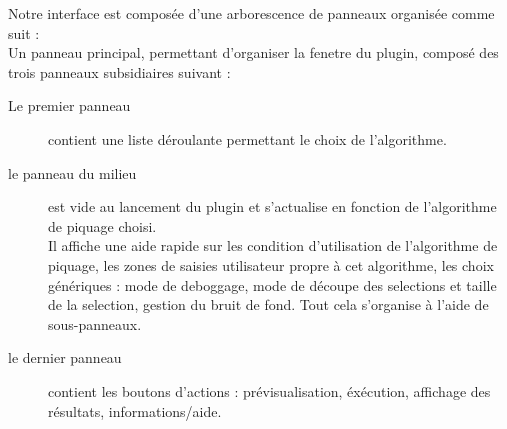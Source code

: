 Notre interface est composée d'une arborescence de panneaux organisée comme suit : \\
Un panneau principal, permettant d'organiser la fenetre du plugin, composé des trois panneaux subsidiaires suivant :
\begin{description}
\item [Le premier panneau] contient une liste déroulante permettant le choix de l'algorithme. 
\item [le panneau du milieu] est vide au lancement du plugin et s'actualise en fonction de l'algorithme de piquage choisi.\\
Il affiche une aide rapide sur les condition d'utilisation de l'algorithme de piquage, les zones de saisies utilisateur propre à cet algorithme, les choix génériques : mode de deboggage, mode de découpe des selections et taille de la selection, gestion du bruit de fond. Tout cela s'organise à l'aide de sous-panneaux.
\item [le dernier panneau] contient les boutons d'actions : prévisualisation, éxécution, affichage des résultats, informations/aide.
\end{description}
